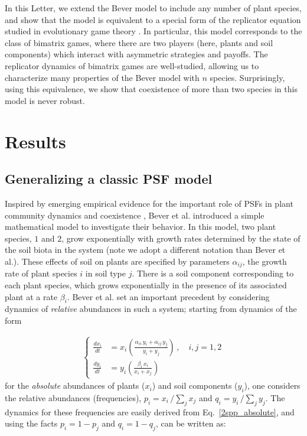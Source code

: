 \documentclass[11pt]{article}
\begin{document}
In this Letter, we extend the Bever model to include any number of plant species, and show that the model is equivalent to a special form of the replicator equation studied in evolutionary game theory \cite{hofbauer1998evolutionary}. In particular, this model corresponds to the class of bimatrix games, where there are two players (here, plants and soil components) which interact with asymmetric strategies and payoffs. The replicator dynamics of bimatrix games are well-studied, allowing us to characterize many properties of the Bever model with $n$ species. Surprisingly, using this equivalence, we show that coexistence of more than two species in this model is never robust. 

\section{Results}

\subsection{Generalizing a classic PSF model}

Inspired by emerging empirical evidence for the important role of PSFs in plant community dynamics and coexistence \cite{van1993plant,bever1994feedback}, Bever et al. \cite{bever1997incorporating} introduced a simple mathematical model to investigate their behavior. In this model, two plant species, $1$ and $2$, grow exponentially with growth rates determined by the state of the soil biota in the system (note we adopt a different notation than Bever et al.). These effects of soil on plants are specified by parameters $\alpha_{ij}$, the growth rate of plant species $i$ in soil type $j$. There is a soil component corresponding to each plant species, which grows exponentially in the presence of its associated plant at a rate $\beta_i$. Bever et al. set an important precedent by considering dynamics of \emph{relative} abundances in such a system; starting from dynamics of the form

\begin{align} \label{2spp_absolute}
	\begin{cases}
	\frac{dx_i}{dt} &= x_i \left( \frac{\alpha_{ii} \, y_i + \alpha_{ij} \, y_j}{y_i + y_j} \right) \, , \quad  i, j = 1,2 \\
	\frac{dy_i}{dt} &= y_i \left( \frac{\beta_i \, x_i}{x_i + x_j} \right)
	\end{cases}
\end{align}
for the \emph{absolute} abundances of plants ($x_i$) and soil components ($y_i$), one considers the relative abundances (frequencies), $p_i = x_i \, / \sum_j x_j$ and $q_i = y_i \, / \sum_{j} y_j$. The dynamics for these frequencies are easily derived from Eq.~\ref{2spp_absolute}, and using the facts $p_i = 1 - p_j$ and $q_i = 1 - q_j$, can be written as:
\end{document}
